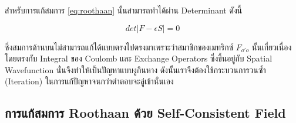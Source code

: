 สำหรับการแก้สมการ \ref{eq:roothaan} นั้นสามารถทำได้ผ่าน Determinant ดังนี้

\begin{equation}
    det|F - \epsilon S| = 0
\end{equation}

ซึ่งสมการด้านบนไม่สามารถแก้ได้แบบตรงไปตรงมาเพราะว่าสมาชิกของเมทริกซ์ $F_{o'o}$ นั้นเกี่ยวเนื่องโดยตรงกับ Integral ของ Coulomb และ Exchange Operators
ซึ่งขึ้นอยู่กับ Spatial Wavefunction นั่นจึงทำให้เป็นปัญหาแบบงูกินหาง ดังนั้นเราจึงต้องใช้กระบวนการวนซ้ำ (Iteration) ในการแก้ปัญหาจนกว่าตำตอบจะลู่เข้านั่นเอง

\subsection{การแก้สมการ Roothaan ด้วย Self-Consistent Field}

